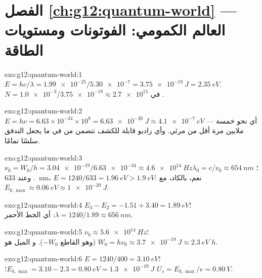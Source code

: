 \section*{الفصل \ref{ch:g12:quantum-world} --- العالم الكمومي: الفوتونات ومستويات الطاقة}

\begin{solution}{exo:g12:quantum-world:1}
$E = hc/\lambda = \num{1.99e-25}/\num{5.30e-7} = \qty{3.75e-19}{J} =
\qty{2.35}{eV}$. $N = \num{1.0e-3}/\num{3.75e-19} \approx \num{2.7e15}$
 في .
\end{solution}

\begin{solution}{exo:g12:quantum-world:2}
$E = h\nu = 6.63\times10^{-34} \times 10^{8} = \qty{6.63e-26}{J}
\approx \qty{4.1e-7}{eV}$ --- أي نحو خمسة ملايين مرة أقل من
 مرئي. وأي  راديو قابلة للكشف تتضمن من 
في  ما يجعل التدفق سلسًا تمامًا.
\end{solution}

\begin{solution}{exo:g12:quantum-world:3}
$\nu_0 = W_0/h = \num{3.04e-19}/\num{6.63e-34} \approx
\qty{4.6e14}{Hz}$؛ $\lambda_0 = c/\nu_0 \approx \qty{654}{nm}$. وعند
\qty{633}{nm}، $E = 1240/633 = \qty{1.96}{eV} > \qty{1.9}{eV}$: نعم،
بالكاد، مع $E_{k,\max} \approx \qty{0.06}{eV} \approx \qty{1e-20}{J}$.
\end{solution}

\begin{solution}{exo:g12:quantum-world:4}
$E_3 - E_2 = -1.51 + 3.40 = \qty{1.89}{eV}$؛
$\lambda = 1240/1.89 \approx \qty{656}{nm}$: أي الخط الأحمر.
\end{solution}

\begin{solution}{exo:g12:quantum-world:5}
$\nu_0 \approx \qty{5.6e14}{Hz}$؛ $W_0 = h\nu_0 \approx
\qty{3.7e-19}{J} \approx \qty{2.3}{eV}$ (وهو القاطع $-W_0$). و
الميل هو  $h$.
\end{solution}

\begin{solution}{exo:g12:quantum-world:6}
$E = 1240/400 = \qty{3.10}{eV}$؛ $E_{k,\max} = 3.10 - 2.3 =
\qty{0.80}{eV} = \qty{1.3e-19}{J}$؛ $U_s = E_{k,\max}/e =
\qty{0.80}{V}$.
\end{solution}

